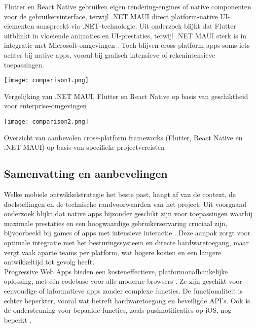 Flutter en React Native gebruiken eigen rendering-engines of native componenten voor de gebruikersinterface, terwijl .NET MAUI direct platform-native UI-elementen aanspreekt via .NET-technologie. Uit onderzoek blijkt dat Flutter uitblinkt in vloeiende animaties en UI-prestaties, terwijl .NET MAUI sterk is in integratie met Microsoft-omgevingen \autocite{Gajjam2025}. Toch blijven cross-platform apps soms iets achter bij native apps, vooral bij grafisch intensieve of rekenintensieve toepassingen.

\begin{table}[h]
    \centering
    \texttt{[image: comparison1.png]}
    \caption[Integratie]{Vergelijking van .NET MAUI, Flutter en React Native op basis van geschiktheid voor enterprise-omgevingen \autocite{Gajjam2025}}
    \label{fig:vergelijking}
\end{table}

\begin{table}[h]
    \centering
    \texttt{[image: comparison2.png]}
    \caption[Frameworkkeuze]{Overzicht van aanbevolen cross-platform frameworks (Flutter, React Native en .NET MAUI) op basis van specifieke projectvereisten \autocite{Gajjam2025}}
    \label{tab:frameworkkeuze}
\end{table}

\subsection{Samenvatting en aanbevelingen}
Welke mobiele ontwikkelstrategie het beste past, hangt af van de context, de doelstellingen en de technische randvoorwaarden van het project. Uit voorgaand onderzoek blijkt dat native apps bijzonder geschikt zijn voor toepassingen waarbij maximale prestaties en een hoogwaardige gebruikerservaring cruciaal zijn, bijvoorbeeld bij games of apps met intensieve interactie \autocite{Jobe2013, PokuMarboah2021}. Deze aanpak zorgt voor optimale integratie met het besturingssysteem en directe hardwaretoegang, maar vergt vaak aparte teams per platform, wat hogere kosten en een langere ontwikkeltijd tot gevolg heeft.\\

Progressive Web Apps bieden een kosteneffectieve, platformonafhankelijke oplossing, met één codebase voor alle moderne browsers \autocite{Magomadov2020, Research2024}. Ze zijn geschikt voor eenvoudige of informatieve apps zonder complexe functies. De functionaliteit is echter beperkter, vooral wat betreft hardwaretoegang en beveiligde API’s. Ook is de ondersteuning voor bepaalde functies, zoals pushnotificaties op iOS, nog beperkt \autocite{Zhong2015}.\\

